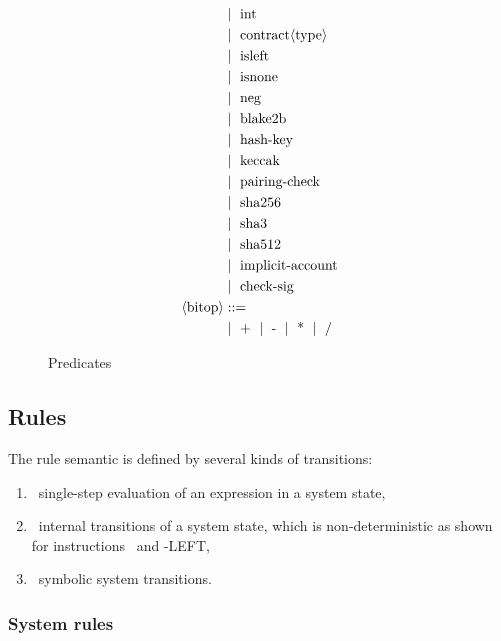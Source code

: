 \documentclass[a4paper,UKenglish]{dagrep-v2021}
\begin{document}
\begin{figure}[h]
\begin{align*}
   &\Mid\ \text{int} \\
   &\Mid\ \text{contract}  \langle \text{type} \rangle \\
   &\Mid\ \text{isleft} \\
   &\Mid\ \text{isnone} \\
   &\Mid\ \text{neg} \\
   &\Mid\ \text{blake2b} \\
   &\Mid\ \text{hash-key} \\
   &\Mid\ \text{keccak} \\
   &\Mid\ \text{pairing-check} \\
   &\Mid\ \text{sha256} \\
   &\Mid\ \text{sha3} \\
   &\Mid\ \text{sha512} \\
   &\Mid\ \text{implicit-account} \\
   &\Mid\ \text{check-sig} \\
\langle \text{bitop} \rangle &::= \\ 
   &\Mid\ \text{+}\ \Mid\ \text{-}\ \Mid\ \text{*}\ \Mid\ \text{/}
\end{align*}
\caption{Predicates}
\label{fig:predicate}
\end{figure}



\pagebreak
\subsection{Rules}
The rule semantic is defined by several kinds of transitions:
\begin{enumerate}
\item \ExprTrans\ single-step evaluation of an expression in a system state,
\item \StateTrans\ internal transitions of a system state, which is non-deterministic  as shown for instructions \LOOP\ and \LOOP-LEFT,
\item \SystemTrans\ symbolic system transitions.
\end{enumerate}

\subsubsection{System rules}
\begin{mathpar}
\end{mathpar}
\end{document}
